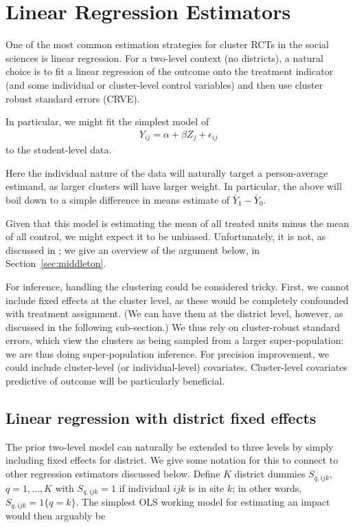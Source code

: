 \documentclass[12pt]{article}
\begin{document}
\section{Linear Regression Estimators}\label{linear-regression-estimators}


One of the most common estimation strategies for cluster RCTs in the
social sciences is linear regression.
For a two-level context (no
districts), a natural choice is to fit a linear regression of the
outcome onto the treatment indicator (and some individual or
cluster-level control variables) and then use cluster robust standard
errors (CRVE).

In particular, we might fit the simplest model of
\begin{align*}
	Y_{ij} = \alpha + \beta Z_j + \epsilon_{ij} 
\end{align*}
to the student-level data.

Here the individual nature of the data will naturally target a
person-average estimand, as larger clusters will have larger weight.
In particular, the above will boil down to a simple difference in means estimate of $\bar{Y}_1 - \bar{Y}_0$.

Given that this model is estimating the mean of all treated units minus the mean of all control, we might expect it to be unbiased.
Unfortunately, it is not, as discussed in \cite{Middleton_clusterRCT}; we give an overview of the argument below, in Section~\ref{sec:middleton}.

For inference, handling the clustering could be considered tricky.
First, we cannot include fixed effects at the cluster level, as these would be completely confounded with treatment assignment.
(We can have them at the district level, however, as discussed in the following sub-section.)
We thus rely on cluster-robust standard errors, which view the clusters as being sampled from a larger super-population: we are thus doing super-population inference.
For precision improvement, we could include cluster-level (or individual-level) covariates.
Cluster-level covariates predictive of outcome will be particularly beneficial.



\subsection{Linear regression with district fixed effects}

The prior two-level model can naturally be extended to three levels by simply including fixed effects for district.
We give some notation for this to connect to other regression estimators discussed below. Define $K$ district dummies $S_{q,ijk}$, $q = 1, \ldots, K$ with $S_{q,ijk} = 1$ if individual $ijk$ is in
site $k$; in other words, $S_{q,ijk} = 1\{ q = k \}$.
The simplest OLS working model for estimating an impact would then
arguably be
\end{document}
